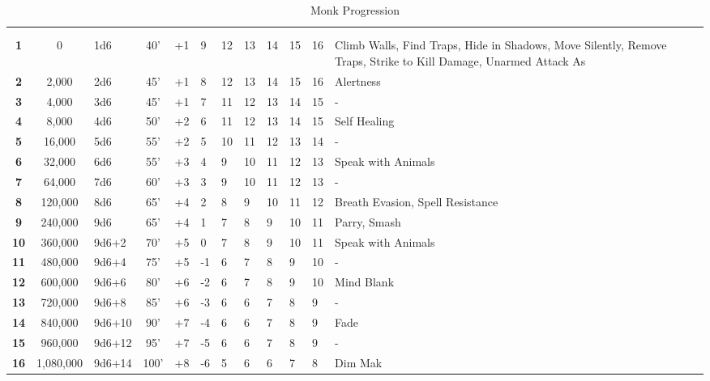 \begin {table}[H]
  \caption{Monk Progression}
	\begin{tabularx}{\columnwidth}{>{\bfseries}ccM{.25in}cM{.31in}M{.36in}M{.51in}M{.25in}M{.43in}M{.32in}M{.45in}Y}
    \thead{}&\thead{}&\thead{}&\thead{}&\thead{}&\thead{}&\thead{}&\setcounter{rownum}{0}\\
		 &  &  &  &  &  &  &  &  &  &  & \\
		1 & 0 & 1d6 & 40’ & +1 & 9 & 12 & 13 & 14 & 15 & 16 & Climb Walls, Find Traps, Hide in Shadows, Move Silently, Remove Traps, Strike to Kill Damage, Unarmed Attack As\\
		2 & 2,000 & 2d6 & 45’ & +1 & 8 & 12 & 13 & 14 & 15 & 16 & Alertness\\
		3 & 4,000 & 3d6 & 45’ & +1 & 7 & 11 & 12 & 13 & 14 & 15 & -\\
		4 & 8,000 & 4d6 & 50’ & +2 & 6 & 11 & 12 & 13 & 14 & 15 & Self Healing\\
		5 & 16,000 & 5d6 & 55’ & +2 & 5 & 10 & 11 & 12 & 13 & 14 & -\\
		6 & 32,000 & 6d6 & 55’ & +3 & 4 & 9 & 10 & 11 & 12 & 13 & Speak with Animals\\
		7 & 64,000 & 7d6 & 60’ & +3 & 3 & 9 & 10 & 11 & 12 & 13 & -\\
		8 & 120,000 & 8d6 & 65’ & +4 & 2 & 8 & 9 & 10 & 11 & 12 & Breath Evasion, Spell Resistance\\
		9 & 240,000 & 9d6 & 65’ & +4 & 1 & 7 & 8 & 9 & 10 & 11 & Parry, Smash\\
		10 & 360,000 & 9d6+2 & 70’ & +5 & 0 & 7 & 8 & 9 & 10 & 11 & Speak with Animals\\
		11 & 480,000 & 9d6+4 & 75’ & +5 & -1 & 6 & 7 & 8 & 9 & 10 & -\\
		12 & 600,000 & 9d6+6 & 80’ & +6 & -2 & 6 & 7 & 8 & 9 & 10 & Mind Blank\\
		13 & 720,000 & 9d6+8 & 85’ & +6 & -3 & 6 & 6 & 7 & 8 & 9 & -\\
		14 & 840,000 & 9d6+10 & 90’ & +7 & -4 & 6 & 6 & 7 & 8 & 9 & Fade\\
		15 & 960,000 & 9d6+12 & 95’ & +7 & -5 & 6 & 6 & 7 & 8 & 9 & -\\
		16 & 1,080,000 & 9d6+14 & 100’ & +8 & -6 & 5 & 6 & 6 & 7 & 8 & Dim Mak\\

\end{tabularx}
\end{table}
